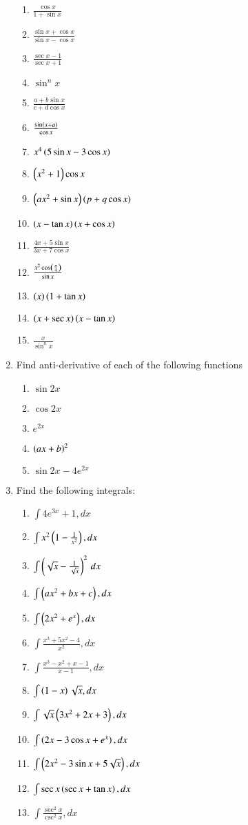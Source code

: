 \begin{enumerate}[label=\arabic*.,ref=\thesubsection.\theenumi]
\begin{enumerate}[label=(\roman*)]
\item  $\frac{\cos x}{1+\sin x}$
\item  $\frac{\sin x + \cos x}{\sin x - \cos x}$
\item  $\frac{\sec x - 1}{\sec x + 1}$
\item  $\sin^n x$
\item  $\frac{a+b\sin x}{c+d\cos x}$
\item  $\frac{\sin\left(x+ a\right)}{\cos x}$
\item  $x^4\left(5\sin x - 3 \cos x\right)$
\item  $\left(x^2+1\right)\cos x$
\item  $\left(ax^2+\sin x\right)\left(p +q\cos x\right)$
\item  $\left(x-\tan x\right)\left(x +\cos x\right)$
\item  $\frac{4x+5\sin x}{3x+7\cos x}$
\item  $\frac{x^2\cos \left(\frac{\pi}{4}\right)}{\sin x}$
\item  $\left(x\right)\left(1+\tan x\right)$
\item  $\left(x+\sec x\right)\left(x -\tan x\right)$
\item  $\frac{x}{\sin^n x}$
%
\end{enumerate}
%
\item Find anti-derivative of each of the following functions
\begin{enumerate}
\item $\sin 2x$
\item $\cos 2x$
\item $e^{ 2x}$
\item $\left( ax+b\right)^2$
\item $\sin 2x - 4e^{2x}$
\end{enumerate}
%
\item Find the following integrals:
\begin{enumerate}
\item $\int 4e^{3x}+1,dx$
\item $\int x^2\left(1-\frac{1}{x^2}\right),dx$
\item $\int\left(\sqrt{x}-\frac{1}{\sqrt{x}}\right)^2\,dx$
\item $\int \left(ax^2+bx+c\right),dx$
\item $\int \left(2x^2+e^x\right),dx$
\item $\int \frac{x^3+5x^2-4}{x^2},dx$
\item $\int \frac{x^3-x^2+x-1}{x-1},dx$
\item $\int \left(1-x\right)\sqrt{x},dx$
\item $\int \sqrt{x}\left(3x^2+2x+3\right),dx$
\item $\int \left(2x-3\cos x + e^x\right),dx$
\item $\int \left(2x^2-3\sin x + 5\sqrt{x}\right),dx$
\item $\int \sec x\left(\sec x + \tan x\right),dx$
\item $\int \frac{\sec^2 x}{\csc^2x},dx$


\end{enumerate}
\end{enumerate}
